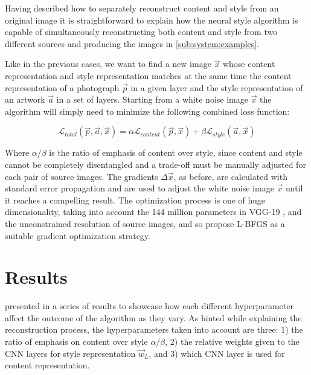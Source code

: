 Having described how to separately reconstruct content and style from an original image it is straightforward to explain how the neural style algorithm is capable of simultaneously reconstructing both content and style from two different sources and producing the images in \autoref{sub:system:examples}.

Like in the previous cases, we want to find a new image $\vec{x}$ whose content representation and style representation matches at the same time the content representation of a photograph $\vec{p}$ in a given layer and the style representation of an artwork $\vec{a}$ in a set of layers.
Starting from a white noise image $\vec{x}$ the algorithm will simply need to minimize the following combined loss function:

\begin{equation}
  \mathcal{L}_{total}(\vec{p}, \vec{a}, \vec{x}) =
    \alpha \mathcal{L}_{content}(\vec{p}, \vec{x}) +
    \beta \mathcal{L}_{style}(\vec{a}, \vec{x})
\end{equation}

Where $\alpha/\beta$ is the ratio of emphasis of content over style, since content and style cannot be completely disentangled and a trade-off must be manually adjusted for each pair of source images.
The gradients $\Delta \vec{x}$, as before, are calculated with standard error propagation and are used to adjust the white noise image $\vec{x}$ until it reaches a compelling result.
The optimization process is one of huge dimensionality, taking into account the 144 million parameters in VGG-19 \cite{Simonyan2014}, and the unconstrained resolution of source images, and so \citeauthor{Gatys2015A} propose L-BFGS \cite{Zhu1994} as a suitable gradient optimization strategy.



\section{Results}
\label{sec:system:results}

\citeauthor{Gatys2015B} presented in \cite{Gatys2015B} a series of results to showcase how each different hyperparameter affect the outcome of the algorithm as they vary.
As hinted while explaining the reconstruction process, the hyperparameters taken into account are three: 1) the ratio of emphasis on content over style $\alpha / \beta$, 2) the relative weights given to the CNN layers for style representation $\vec{w}_L$, and 3) which CNN layer is used for content representation.

